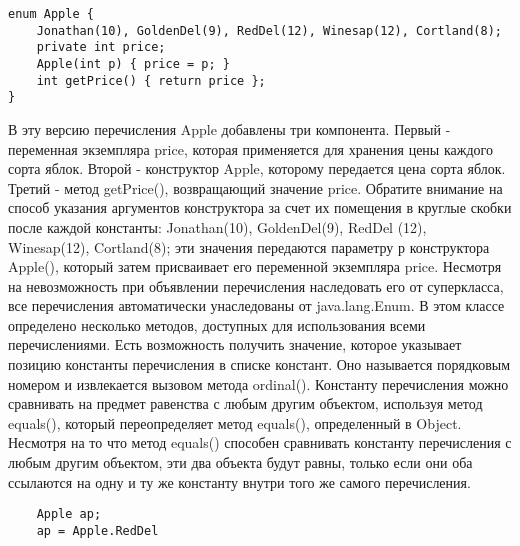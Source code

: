 \begin{lstlisting}
enum Apple {
    Jonathan(10), GoldenDel(9), RedDel(12), Winesap(12), Cortland(8);
    private int price;
    Apple(int p) { price = p; }
    int getPrice() { return price };
}
\end{lstlisting}
В эту версию перечисления Apple добавлены три компонента. Первый - переменная экземпляра price, которая применяется для хранения цены каждого сорта яблок. Второй - конструктор Apple, которому передается цена сорта яблок. Третий - метод getPrice(), возвращающий значение price. Обратите внимание на способ указания аргументов конструктора за счет их помещения в круглые скобки после каждой константы: Jonathan(10), GoldenDel(9), RedDel (12), Winesap(12), Cortland(8); эти значения передаются параметру р конструктора Apple(), который затем присваивает его переменной экземпляра price. Несмотря на невозможность при объявлении перечисления наследовать его от суперкласса, все перечисления автоматически унаследованы от java.lang.Enum. В этом классе определено несколько методов, доступных для использования всеми перечислениями. Есть возможность получить значение, которое указывает позицию константы перечисления в списке констант. Оно называется порядковым номером и извлекается вызовом метода ordinal(). Константу перечисления можно сравнивать на предмет равенства с любым другим объектом, используя метод equals(), который переопределяет метод equals(), определенный в Object. Несмотря на то что метод equals() способен сравнивать константу перечисления с любым другим объектом, эти два объекта будут равны, только если они оба ссылаются на одну и ту же константу внутри того же самого перечисления.
\begin{lstlisting}
    Apple ap;
    ap = Apple.RedDel
\end{lstlisting}
